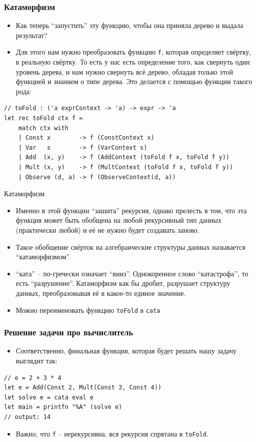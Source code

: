\documentclass{beamer}
\begin{document}
\begin{frame}[fragile]
\frametitle{Катаморфизм}

\begin{itemize}
\item
  Как теперь ``запустить'' эту функцию, чтобы она приняла дерево и
  выдала результат?
\item
  Для этого нам нужно преобразовать функцию \texttt{f}, которая
  определяет свёртку, в реальную свёртку. То есть у нас есть определение
  того, как свернуть один уровень дерева, и нам нужно свернуть всё
  дерево, обладая только этой функцией и знанием о типе дерева. Это
  делается с помощью функции такого рода:
\end{itemize}
\begin{lstlisting}
// toFold : ('a exprContext -> 'a) -> expr -> 'a
let rec toFold ctx f = 
    match ctx with
    | Const x        -> f (ConstContext x)
    | Var   s        -> f (VarContext s)
    | Add  (x, y)    -> f (AddContext (toFold f x, toFold f y))
    | Mult (x, y)    -> f (MultContext (toFold f x, toFold f y))
    | Observe (d, a) -> f (ObserveContext(d, a))
\end{lstlisting}
\end{frame}

\begin{frame}{Катаморфизм}

\begin{itemize}
\item
  Именно в этой функции ``зашита'' рекурсия, однако прелесть в том, что
  эта функция может быть обобщена на любой рекурсивный тип данных
  (практически любой) и её не нужно будет создавать заново.
\item
  Такое обобщение свёрток на алгебраические структуры данных называется
  ``катаморфизмом''.
\item
  ``ката'' -- по-гречески означает ``вниз''. Однокоренное слово
  ``катастрофа'', то есть ``разрушение''. Катаморфизм как бы дробит,
  разрушает структуру данных, преобразовывая её в какое-то единое
  значение.
\item
  Можно переименовать функцию \texttt{toFold} в \texttt{cata}
\end{itemize}
\end{frame}

\begin{frame}[fragile]
\frametitle{Решение задачи про вычислитель}

\begin{itemize}
\item
  Соответственно, финальная функция, которая будет решать нашу задачу
  выглядит так:
\end{itemize}
\begin{lstlisting}
// e = 2 + 3 * 4
let e = Add(Const 2, Mult(Const 3, Const 4))
let solve e = cata eval e
let main = printfn "%A" (solve e)
// output: 14
\end{lstlisting}
\begin{itemize}
\item
  Важно, что \texttt{f} -- нерекурсивна, вся рекурсия спрятана в
  \texttt{toFold}.
\end{itemize}
\end{frame}
\end{document}
